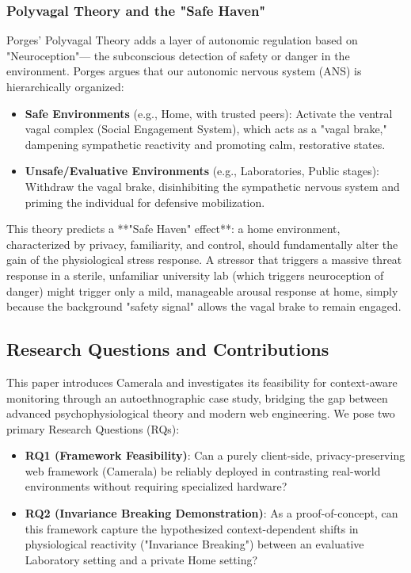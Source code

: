 \documentclass[journal]{IEEEtran}
\begin{document}
\subsubsection{Polyvagal Theory and the "Safe Haven"}
Porges' Polyvagal Theory \cite{polyvagal, porges_safe_haven} adds a layer of autonomic regulation based on "Neuroception"—
the subconscious detection of safety or danger in the environment. Porges argues that our autonomic nervous system (ANS) is hierarchically organized:
\begin{itemize}
    \item \textbf{Safe Environments} (e.g., Home, with trusted peers): Activate the ventral vagal complex (Social Engagement System), 
    which acts as a "vagal brake," dampening sympathetic reactivity and promoting calm, restorative states.
    \item \textbf{Unsafe/Evaluative Environments} (e.g., Laboratories, Public stages): Withdraw the vagal brake, 
    disinhibiting the sympathetic nervous system and priming the individual for defensive mobilization.
\end{itemize}
This theory predicts a **"Safe Haven" effect**: a home environment, characterized by privacy, familiarity, and control, 
should fundamentally alter the gain of the physiological stress response. A stressor that triggers a massive threat response 
in a sterile, unfamiliar university lab (which triggers neuroception of danger) might trigger only a mild, manageable arousal response at home, 
simply because the background "safety signal" allows the vagal brake to remain engaged.

\subsection{Research Questions and Contributions}
This paper introduces Camerala and investigates its feasibility for context-aware monitoring through an autoethnographic case study, bridging the gap between advanced psychophysiological theory and modern web engineering.
We pose two primary Research Questions (RQs):
\begin{itemize}
    \item \textbf{RQ1 (Framework Feasibility)}: Can a purely client-side, privacy-preserving web framework (Camerala) be reliably deployed in contrasting real-world environments without requiring specialized hardware?
    \item \textbf{RQ2 (Invariance Breaking Demonstration)}: As a proof-of-concept, can this framework capture the hypothesized context-dependent shifts in physiological reactivity ("Invariance Breaking") between an evaluative Laboratory setting and a private Home setting?
\end{itemize}
\end{document}
